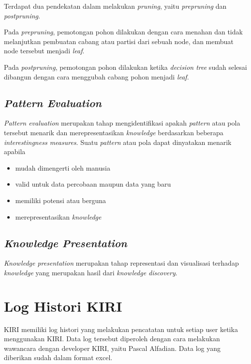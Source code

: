 Terdapat dua pendekatan dalam melakukan \textsl{pruning}, yaitu \textsl{prepruning} dan \textsl{postpruning}.

Pada \textsl{prepruning}, pemotongan pohon dilakukan dengan cara menahan dan tidak melanjutkan pembuatan cabang atau partisi dari sebuah node, dan membuat node tersebut menjadi \textsl{leaf}. 

Pada \textsl{postpruning}, pemotongan pohon dilakukan ketika \textsl{decision tree} sudah selesai dibangun dengan cara menggubah cabang pohon menjadi \textsl{leaf}.

\subsection{\textsl{Pattern Evaluation}}
\textsl{Pattern evaluation} merupakan tahap mengidentifikasi apakah \textsl{pattern} atau pola tersebut menarik dan merepresentasikan \textsl{knowledge} berdasarkan beberapa \textsl{interestingness measures}.
Suatu \textsl{pattern} atau pola dapat dinyatakan menarik apabila
\begin{itemize}
	\item mudah dimengerti oleh manusia
	\item valid untuk data percobaan maupun data yang baru
	\item memiliki potensi atau berguna
	\item merepresentasikan \textsl{knowledge}
\end{itemize}

\subsection{\textsl{Knowledge Presentation}}
\textsl{Knowledge presentation} merupakan tahap representasi dan visualisasi terhadap \textsl{knowledge} yang merupakan hasil dari \textsl{knowledge discovery}.	

\section{Log Histori KIRI}

KIRI memiliki log histori yang melakukan pencatatan untuk setiap user ketika menggunakan KIRI. Data log tersebut diperoleh dengan cara melakukan wawancara dengan developer KIRI, yaitu Pascal Alfadian. Data log yang diberikan sudah dalam format excel.

